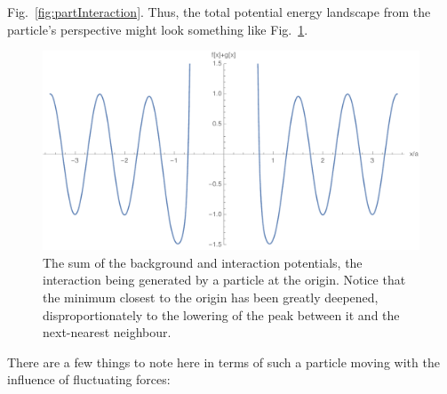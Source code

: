Fig.~\ref{fig:partInteraction}. Thus, the 
total potential energy landscape from the particle's perspective might look something like 
Fig.~\ref{fig:fullPot}.
\begin{figure} \caption[The sum of the background and interaction potentials.]{The sum of the background
and interaction potentials, the interaction being generated by a particle at the origin. Notice that
the minimum closest to the origin has been greatly deepened, disproportionately to the lowering
of the peak between it and the next-nearest neighbour.} 
\label{fig:fullPot}
\begin{center}
\includegraphics[width=1.0\textwidth]{intro/images/fgSumPlot}
\end{center}
\end{figure}
There are a few things to note here in terms of such a particle moving with
the influence of fluctuating forces:
